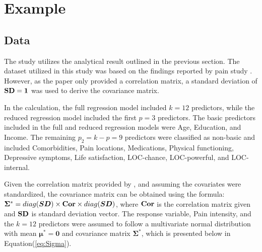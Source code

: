 \chapter{Example}

\section{Data}
The study utilizes the analytical result outlined in the previous section. The dataset utilized in this study was based on the findings reported by pain study \cite{baker2008chronicpain}. However, as the paper only provided a correlation matrix, a standard deviation of $\bm{\mathrm{SD}} = \bm1$ was used to derive the covariance matrix.

In the calculation, the full regression model included $k = 12$ predictors, while the reduced regression model included the first $p = 3$ predictors. The basic predictors included in the full and reduced regression models were Age, Education, and Income. The remaining $p_2 = k-p = 9$ predictors were classified as non-basic and included Comorbidities, Pain locations, Medications, Physical functioning, Depressive symptoms, Life satisfaction, LOC-chance, LOC-powerful, and LOC-internal.

Given the correlation matrix provided by \cite{baker2008chronicpain}, and assuming the covariates were standardized, the covariance matrix can be obtained using the formula: $\bm\Sigma^* = diag(\bm {SD}) \times \bm{\mathrm{Cor}} \times diag(\bm {SD})$, where $\bm{\mathrm{Cor}}$ is the correlation matrix given and $\bm{\mathrm{SD}}$ is standard deviation vector. The response variable, Pain intensity, and the $k = 12$ predictors were assumed to follow a multivariate normal distribution with mean $\bm{\mu}^* = \boldsymbol{0}$ and covariance matrix $\bm{\Sigma^*}$, which is presented below in Equation(\ref{eq:Sigma}).

